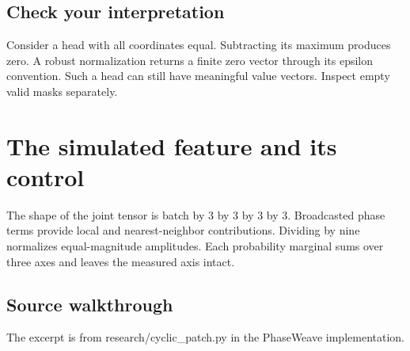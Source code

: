 \documentclass[11pt,oneside,openany]{book}
\begin{document}
\section*{Check your interpretation}
Consider a head with all coordinates equal. Subtracting its maximum produces zero. A robust normalization returns a finite zero vector through its epsilon convention. Such a head can still have meaningful value vectors. Inspect empty valid masks separately.

\chapter{The simulated feature and its control}
The shape of the joint tensor is batch by 3 by 3 by 3 by 3. Broadcasted phase terms provide local and nearest-neighbor contributions. Dividing by nine normalizes equal-magnitude amplitudes. Each probability marginal sums over three axes and leaves the measured axis intact.

\section*{Source walkthrough}
The excerpt is from research/cyclic\_patch.py in the PhaseWeave implementation.
\end{document}
